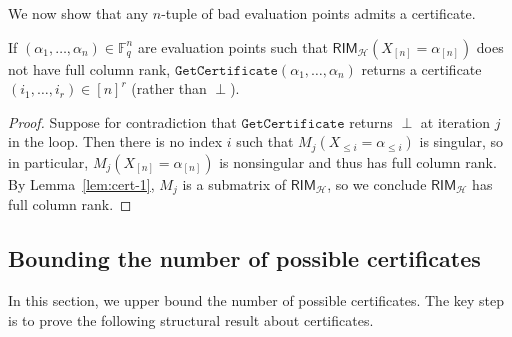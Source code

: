 \documentclass{article}[11pt]
\begin{document}
We now show that any $n$-tuple of bad evaluation points admits a certificate. 

\begin{lemma}
  If $(\alpha_1,\dots,\alpha_n) \in \mathbb{F}_q^n$ are evaluation points such that $\mathsf{RIM}_\mathcal{H}(X_{[n]}=\alpha_{[n]})$ does not have full column rank, $\mathtt{GetCertificate}(\alpha_1,\dots,\alpha_n)$ returns a certificate $(i_1,\dots,i_r) \in [n]^r$ (rather than $\perp$).
  \label{lem:cert-2}
\end{lemma}
\begin{proof}
  Suppose for contradiction that $\mathtt{GetCertificate}$ returns $\perp$ at iteration $j$ in the loop.
  Then there is no index $i$ such that $M_j(X_{\le i}=\alpha_{\le i})$ is singular, so in particular, $M_j(X_{[n]}=\alpha_{[n]})$ is nonsingular and thus has full column rank.
  By Lemma~\ref{lem:cert-1}, $M_j$ is a submatrix of $\mathsf{RIM}_\mathcal{H}$, so we conclude $\mathsf{RIM}_\mathcal{H}$ has full column rank.
\end{proof}





\subsection{Bounding the number of possible certificates}

In this section, we upper bound the number of possible certificates.
The key step is to prove the following structural result about certificates.
\end{document}

